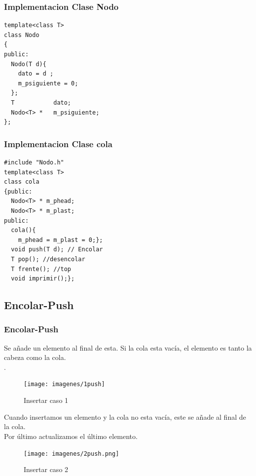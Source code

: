 \documentclass{beamer}
\begin{document}
\begin{frame}[fragile]
\frametitle{Implementacion Clase Nodo}
\begin{verbatim}
template<class T>
class Nodo
{
public:
  Nodo(T d){
    dato = d ;
    m_psiguiente = 0;
  };  
  T           dato;
  Nodo<T> *   m_psiguiente;
};
\end{verbatim}
\end{frame}


\begin{frame}[fragile]
\frametitle{Implementacion Clase cola}
\begin{verbatim}
#include "Nodo.h"
template<class T>
class cola
{public:
  Nodo<T> * m_phead;
  Nodo<T> * m_plast;
public:
  cola(){
    m_phead = m_plast = 0;};
  void push(T d); // Encolar
  T pop(); //desencolar
  T frente(); //top
  void imprimir();};
\end{verbatim}
\end{frame}




 \subsection{Encolar-Push}
    \begin{frame}
      \frametitle{Encolar-Push}
      Se añade un elemento al final de esta. Si la cola esta vacía, el elemento es tanto la cabeza como la cola.\\
      .\\
      
      \begin{figure}
    \texttt{[image: imagenes/1push]}
    \caption{Insertar caso 1}
    \end{figure}
    \end{frame}
    
    \begin{frame}
  Cuando insertamos un elemento y la cola no esta vacía, este se añade al final de la cola.\\
  Por último actualizamos el último elemento.\\
    
    \begin{figure}
  \texttt{[image: imagenes/2push.png]}
      \caption{Insertar caso 2}
      \end{figure}
   
   \end{frame}
\end{document}
